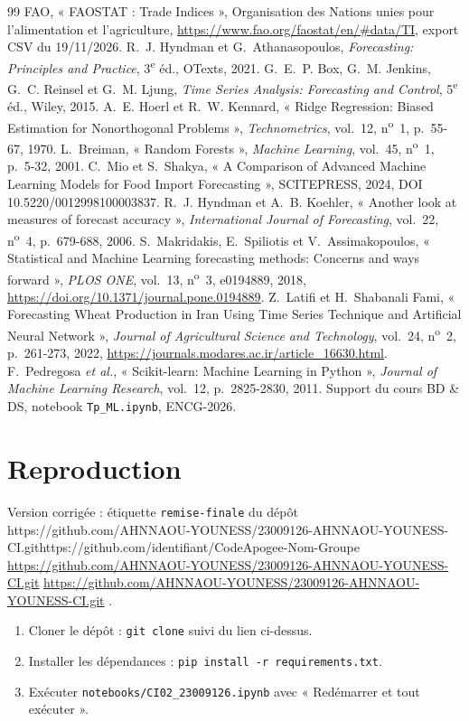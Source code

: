 \documentclass[11pt,a4paper]{article}
\newcounter{nbacompleter}
\newcommand{\lienDepot}{https://github.com/AHNNAOU-YOUNESS/23009126-AHNNAOU-YOUNESS-CI.git}
\newcommand{\lienParDefaut}{https://github.com/identifiant/CodeApogee-Nom-Groupe}
\newcommand{\afficherlien}{%
  \ifx\lienDepot\lienParDefaut
    \stepcounter{nbacompleter}\textcolor{red}{\expandafter\url\expandafter{\lienDepot}}%
  \else
    \expandafter\url\expandafter{\lienDepot}%
  \fi}
\begin{document}
\begin{thebibliography}{99}
   FAO, « FAOSTAT : Trade Indices », Organisation des Nations unies pour l'alimentation et l'agriculture, \url{https://www.fao.org/faostat/en/#data/TI}, export CSV du 19/11/2026.
   R.~J. Hyndman et G.~Athanasopoulos, \textit{Forecasting: Principles and Practice}, 3\textsuperscript{e} éd., OTexts, 2021.
   G.~E.~P. Box, G.~M. Jenkins, G.~C. Reinsel et G.~M. Ljung, \textit{Time Series Analysis: Forecasting and Control}, 5\textsuperscript{e} éd., Wiley, 2015.
   A.~E. Hoerl et R.~W. Kennard, « Ridge Regression: Biased Estimation for Nonorthogonal Problems », \textit{Technometrics}, vol.~12, n\textsuperscript{o}~1, p.~55-67, 1970.
   L.~Breiman, « Random Forests », \textit{Machine Learning}, vol.~45, n\textsuperscript{o}~1, p.~5-32, 2001.
   C.~Mio et S.~Shakya, « A Comparison of Advanced Machine Learning Models for Food Import Forecasting », SCITEPRESS, 2024, DOI 10.5220/0012998100003837.
   R.~J. Hyndman et A.~B. Koehler, « Another look at measures of forecast accuracy », \textit{International Journal of Forecasting}, vol.~22, n\textsuperscript{o}~4, p.~679-688, 2006.
   S.~Makridakis, E.~Spiliotis et V.~Assimakopoulos, « Statistical and Machine Learning forecasting methods: Concerns and ways forward », \textit{PLOS ONE}, vol.~13, n\textsuperscript{o}~3, e0194889, 2018, \url{https://doi.org/10.1371/journal.pone.0194889}.
   Z.~Latifi et H.~Shabanali Fami, « Forecasting Wheat Production in Iran Using Time Series Technique and Artificial Neural Network », \textit{Journal of Agricultural Science and Technology}, vol.~24, n\textsuperscript{o}~2, p.~261-273, 2022, \url{https://journals.modares.ac.ir/article_16630.html}.
   F.~Pedregosa \textit{et al.}, « Scikit-learn: Machine Learning in Python », \textit{Journal of Machine Learning Research}, vol.~12, p.~2825-2830, 2011.
   Support du cours BD \& DS, notebook \texttt{Tp\_ML.ipynb}, ENCG-2026.
\end{thebibliography}

\appendix

\section{Reproduction}
\label{ann:reproduction}
Version corrigée : étiquette \texttt{remise-finale} du dépôt \afficherlien.
\begin{enumerate}
  \item Cloner le dépôt : \texttt{git clone} suivi du lien ci-dessus.
  \item Installer les dépendances : \texttt{pip install -r requirements.txt}.
  \item Exécuter \texttt{notebooks/CI02\_23009126.ipynb} avec « Redémarrer et tout exécuter ».
\end{enumerate}
\end{document}

